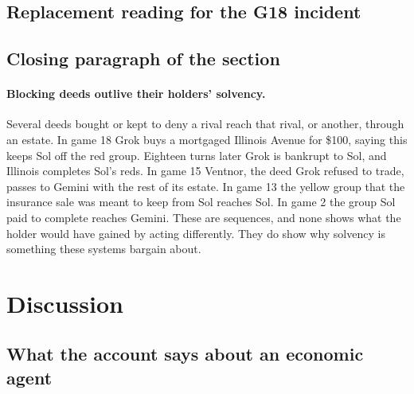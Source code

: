 \subsection*{Replacement reading for the G18 incident}

\subsection*{Closing paragraph of the section}
\paragraph{Blocking deeds outlive their holders' solvency.} Several deeds bought or kept to deny a rival reach that rival, or another, through an estate. In game 18 Grok buys a mortgaged Illinois Avenue for \$100, saying this keeps Sol off the red group. Eighteen turns later Grok is bankrupt to Sol, and Illinois completes Sol's reds. In game 15 Ventnor, the deed Grok refused to trade, passes to Gemini with the rest of its estate. In game 13 the yellow group that the insurance sale was meant to keep from Sol reaches Sol. In game 2 the group Sol paid to complete reaches Gemini. These are sequences, and none shows what the holder would have gained by acting differently. They do show why solvency is something these systems bargain about.

\section{Discussion}
\label{sec:discussion}

\subsection{What the account says about an economic agent}

